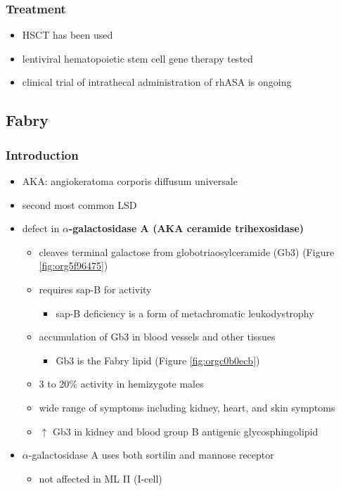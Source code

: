 \documentclass[12pt]{scrartcl}
\begin{document}
\subsubsection{Treatment}
\label{sec:org2ddad3e}
\begin{itemize}
\item HSCT has been used
\item lentiviral hematopoietic stem cell gene therapy tested
\item clinical trial of intrathecal administration of rhASA is ongoing
\end{itemize}
\subsection{Fabry}
\label{sec:org9fadbcf}
\subsubsection{Introduction}
\label{sec:org819a80b}
\begin{itemize}
\item AKA: angiokeratoma corporis diffusum universale
\item second most common LSD
\item defect in \textbf{\(\alpha\)-galactosidase A (AKA ceramide trihexosidase)}
\begin{itemize}
\item cleaves terminal galactose from globotriaosylceramide (Gb3)
(Figure \ref{fig:org5f96475})
\item requires sap-B for activity
\begin{itemize}
\item sap-B deficiency is a form of metachromatic leukodystrophy
\end{itemize}
\item accumulation of Gb3 in blood vessels and other tissues
\begin{itemize}
\item Gb3 is the Fabry lipid (Figure \ref{fig:orgc0b0ecb})
\end{itemize}
\item 3 to 20\% activity in hemizygote males
\item wide range of symptoms including kidney, heart, and skin symptoms
\item \(\uparrow\) Gb3 in kidney and blood group B antigenic glycosphingolipid
\end{itemize}
\item \(\alpha\)-galactosidase A uses both sortilin and mannose receptor
\begin{itemize}
\item not affected in ML II (I-cell)
\end{itemize}
\end{itemize}
\end{document}
